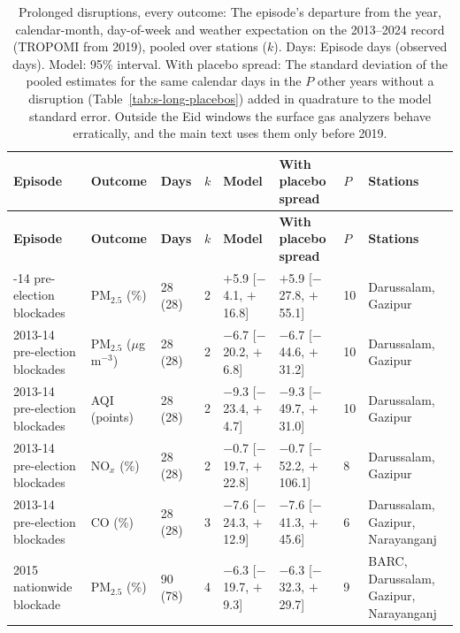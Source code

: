 \begingroup\scriptsize\setlength{\tabcolsep}{3pt}
\begin{longtable}{L{2.6cm} L{2.2cm} C{1.1cm} C{0.4cm} C{2.6cm} C{2.6cm} C{0.7cm} L{2.6cm}}
\caption{Prolonged disruptions, every outcome: The episode's departure from the year, calendar-month, day-of-week and weather expectation on the 2013--2024 record (TROPOMI from 2019), pooled over stations ($k$). Days: Episode days (observed days). Model: 95\% interval. With placebo spread: The standard deviation of the pooled estimates for the same calendar days in the $P$ other years without a disruption (Table~\ref{tab:s-long-placebos}) added in quadrature to the model standard error. Outside the Eid windows the surface gas analyzers behave erratically, and the main text uses them only before 2019.}\label{tab:s-long-episodes}\\
\toprule
\textbf{Episode} & \textbf{Outcome} & \textbf{Days} & \textbf{$k$} & \textbf{Model} & \textbf{With placebo spread} & \textbf{$P$} & \textbf{Stations} \\
\midrule\endfirsthead
\toprule
\textbf{Episode} & \textbf{Outcome} & \textbf{Days} & \textbf{$k$} & \textbf{Model} & \textbf{With placebo spread} & \textbf{$P$} & \textbf{Stations} \\
\midrule\endhead
\bottomrule{}-14 pre-election blockades & PM$_{2.5}$ (\%) & 28 (28) & 2 & $+$5.9 {\scriptsize[$-$4.1, $+$16.8]} & $+$5.9 {\scriptsize[$-$27.8, $+$55.1]} & 10 & Darussalam, Gazipur \\
2013-14 pre-election blockades & PM$_{2.5}$ ($\mu$g\,m$^{-3}$) & 28 (28) & 2 & $-$6.7 {\scriptsize[$-$20.2, $+$6.8]} & $-$6.7 {\scriptsize[$-$44.6, $+$31.2]} & 10 & Darussalam, Gazipur \\
2013-14 pre-election blockades & AQI (points) & 28 (28) & 2 & $-$9.3 {\scriptsize[$-$23.4, $+$4.7]} & $-$9.3 {\scriptsize[$-$49.7, $+$31.0]} & 10 & Darussalam, Gazipur \\
2013-14 pre-election blockades & NO$_x$ (\%) & 28 (28) & 2 & $-$0.7 {\scriptsize[$-$19.7, $+$22.8]} & $-$0.7 {\scriptsize[$-$52.2, $+$106.1]} & 8 & Darussalam, Gazipur \\
2013-14 pre-election blockades & CO (\%) & 28 (28) & 3 & $-$7.6 {\scriptsize[$-$24.3, $+$12.9]} & $-$7.6 {\scriptsize[$-$41.3, $+$45.6]} & 6 & Darussalam, Gazipur, Narayanganj \\
2015 nationwide blockade & PM$_{2.5}$ (\%) & 90 (78) & 4 & $-$6.3 {\scriptsize[$-$19.7, $+$9.3]} & $-$6.3 {\scriptsize[$-$32.3, $+$29.7]} & 9 & BARC, Darussalam, Gazipur, Narayanganj \\

\end{longtable}
